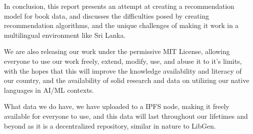 In conclusion, this report presents an attempt at creating a recommendation model for book data, and discusses the  difficulties posed by creating recommendation algorithms, and the unique challenges of making it work in a multilingual environment like Sri Lanka.

We are also releasing our work under the permissive MIT License, allowing everyone to use our work freely, extend, modify, use, and abuse it to it's limits, with the hopes that this will improve the knowledge availability and literacy of our country, and the availability of solid research and data on utilizing our native languages in AI/ML contexts.

What data we do have, we have uploaded to a IPFS node, making it freely available for everyone to use, and this data will last throughout our lifetimes and beyond as it is a decentralized repository, similar in nature to LibGen.